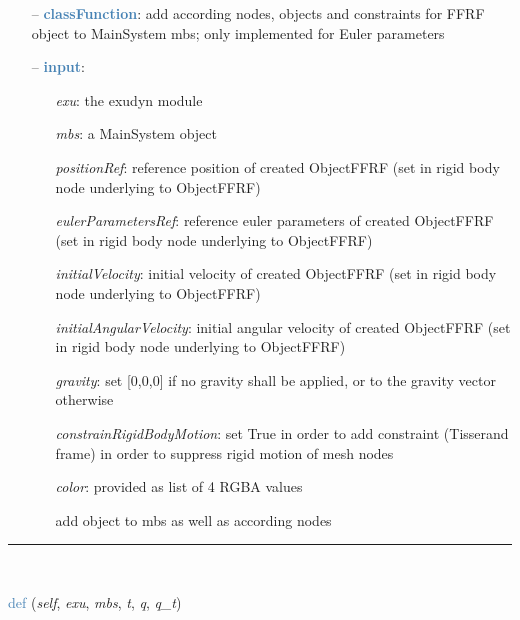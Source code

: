 \begin{itemize}[leftmargin=1.4cm]
\begin{itemize}[leftmargin=1.4cm]
\begin{itemize}[leftmargin=1.4cm]
\begin{itemize}[leftmargin=0.5cm]
\begin{itemize}[leftmargin=1.4cm]
\begin{itemize}[leftmargin=1.4cm]
\begin{itemize}[leftmargin=0.5cm]
\begin{flushleft}
\end{flushleft}
\setlength{\itemindent}{0.7cm}
\begin{itemize}[leftmargin=0.7cm]
\item[--]\textcolor{steelblue}{\bf classFunction}: add according nodes, objects and constraints for FFRF object to MainSystem mbs; only implemented for Euler parameters
\item[--]\textcolor{steelblue}{\bf input}: \vspace{-6pt}
\begin{itemize}[leftmargin=1.2cm]
\setlength{\itemindent}{-0.7cm}
\item[]{\it exu}: the exudyn module
\item[]{\it mbs}: a MainSystem object
\item[]{\it positionRef}: reference position of created ObjectFFRF (set in rigid body node underlying to ObjectFFRF)
\item[]{\it eulerParametersRef}: reference euler parameters of created ObjectFFRF (set in rigid body node underlying to ObjectFFRF)
\item[]{\it initialVelocity}: initial velocity of created ObjectFFRF (set in rigid body node underlying to ObjectFFRF)
\item[]{\it initialAngularVelocity}: initial angular velocity of created ObjectFFRF (set in rigid body node underlying to ObjectFFRF)
\item[]{\it gravity}: set [0,0,0] if no gravity shall be applied, or to the gravity vector otherwise
\item[]{\it constrainRigidBodyMotion}: set True in order to add constraint (Tisserand frame) in order to suppress rigid motion of mesh nodes
\item[]{\it color}: provided as list of 4 RGBA values
\item[]add object to mbs as well as according nodes
\end{itemize}
\vspace{12pt}\end{itemize}
%
\noindent\rule{8cm}{0.75pt}\vspace{1pt} \\ 
\begin{flushleft}
\noindent \textcolor{steelblue}{def {\bf {}}}\label{sec:FEM:ObjectFFRFinterface:UFforce}
({\it self}, {\it exu}, {\it mbs}, {\it t}, {\it q}, {\it q\_t})
\end{flushleft}
\setlength{\itemindent}{0.7cm}

\end{itemize}
\end{itemize}
\end{itemize}
\end{itemize}
\end{itemize}
\end{itemize}
\end{itemize}
